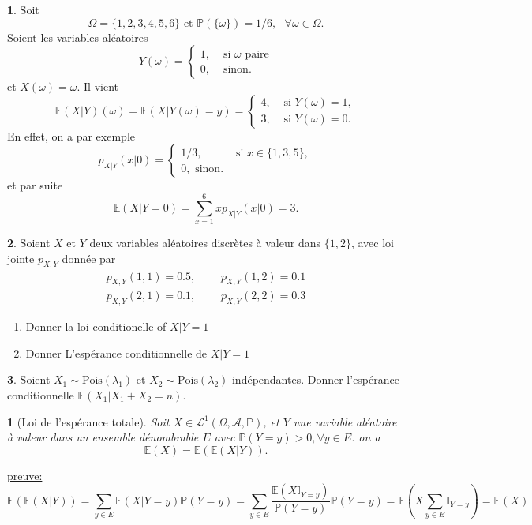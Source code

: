 \documentclass[8pt,notheorems]{beamer}
\def \E{\mathbb E}
\renewcommand{\Pr}{\mathbb{P}}
\newtheorem{prop}{\translate{Proposition}}
\theoremstyle{definition}
\theoremstyle{example}
\newtheorem{example}{\translate{Exemple}}
\theoremstyle{mystyle}
\theoremstyle{plain}
\begin{document}
\begin{frame}[allowframebreaks]
\begin{example}
Soit 
$$
\Omega = \{1,2,3,4,5,6\}\text{ et }\Pr(\{\omega\}) = 1/6,\text{ }\forall \omega\in \Omega.
$$ 
Soient les variables aléatoires
$$
 Y(\omega) =\begin{cases}
 1,&\text{ si $\omega$ paire}\\
 0, &\text{ sinon}.
 \end{cases} 
$$ 
et $X(\omega) = \omega$. Il vient
$$
\E(X|Y)(\omega)  = \E(X|Y(\omega) = y) = 
\begin{cases}
4,&\text{ si }Y(\omega)=1,\\
3,&\text{ si }Y(\omega)=0.
\end{cases}
$$
En effet, on a par exemple
$$
p_{X|Y}(x|0)=
\begin{cases}
1/3,&\text{ si }x\in\{1,3,5\},\\
0,\text{ sinon}.
\end{cases}
$$
et par suite
$$
\E(X|Y = 0) = \sum_{x=1}^6x p_{X|Y}(x|0)  = 3.
$$
\end{example}
\begin{example}
Soient $X$ et $Y$ deux variables aléatoires discrètes à valeur dans $\{1,2\}$, avec loi jointe $p_{X,Y}$ donnée par
\begin{eqnarray*}
p_{X,Y}(1,1)=0.5,&\text{ }&p_{X,Y}(1,2)=0.1\\
p_{X,Y}(2,1)=0.1,&\text{ }&p_{X,Y}(2,2)=0.3
\end{eqnarray*}
\begin{enumerate}
    \item Donner la loi conditionelle of $X|Y=1$
    \item Donner L'espérance conditionnelle de $X|Y = 1$
\end{enumerate}
\end{example}
\begin{example}
Soient $X_1\sim\text{Pois}(\lambda_1)$ et $X_2\sim\text{Pois}(\lambda_2)$ indépendantes. Donner l'espérance conditionnelle $\E(X_1|X_1 + X_2 =n).$
\end{example}
\end{frame}
\begin{frame}[allowframebreaks]
\begin{prop}[Loi de l'espérance totale]
Soit $X\in\mathcal{L}^1(\Omega,\mathcal{A},\Pr)$, et $Y$ une variable aléatoire à valeur dans un ensemble dénombrable $E$ avec $\Pr(Y = y)>0,\forall y\in E$. on a 
$$
\E(X) = \E(\E(X|Y)).
$$
\end{prop}
\underline{preuve:}\\
$$
\E(\E(X|Y)) = \sum_{y\in E}\E(X|Y=y)\Pr(Y = y)= \sum_{y\in E}\frac{\E(X\mathbb{I}_{Y=y})}{\Pr(Y = y)}\Pr(Y = y)=\E\left(X\sum_{y\in E}\mathbb{I}_{Y=y}\right)=\E(X)
$$
\end{frame}
\end{document}
